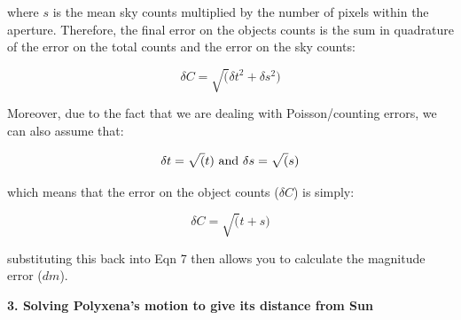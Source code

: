 \documentclass[12pt]{article}
\begin{document}
where $s$ is the mean sky counts multiplied by the number of pixels
within the aperture. Therefore, the final error on the objects counts
is the sum in quadrature of the error on the total counts and the
error on the sky counts:

\begin{equation}
\delta C = \sqrt( \delta t^2 + \delta s^2 )
\end{equation}

Moreover, due to the fact that we are dealing with Poisson/counting
errors, we can also assume that:

\begin{equation}
\delta t = \sqrt(t)\,\, {\rm and}\,\, \delta s = \sqrt(s)
\end{equation}

which means that the error on the object counts ($\delta C$) is
simply:

\begin{equation}
\delta C = \sqrt(t+s)
\end{equation}

substituting this back into Eqn 7 then allows you to calculate the
magnitude error ($dm$).


\newpage
\begin{center}
{\large{\bf 3. Solving Polyxena's motion to give its distance from Sun}}
\end{center}
\centerline{}
\end{document}
